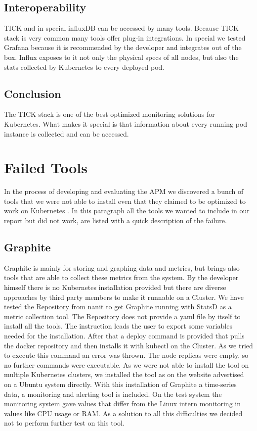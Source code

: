 \subsection{Interoperability}
TICK and in special influxDB can be accessed by many tools. Because TICK stack is very common many tools offer plug-in integrations. In special we tested Grafana because it is recommended by the developer and integrates out of the box. Influx exposes to it not only the physical specs of all nodes, but also the stats collected by Kubernetes to every deployed pod. 
\subsection{Conclusion}
The TICK stack is one of the best optimized monitoring solutions for Kubernetes. What makes it special is that information about every running pod instance is collected and can be accessed.



\section{Failed Tools}%
In the process of developing and evaluating the APM we discovered a bunch of tools that we were not able to install even that they claimed to be optimized to work on Kubernetes .
In this paragraph all the tools we wanted to include in our report but did not work, are listed with a quick description of the failure.
\subsection{Graphite}
Graphite is mainly for storing and graphing data and metrics, but brings also tools that are able to collect these metrics from the system. By the developer himself there is no Kubernetes installation provided but there are diverse approaches by third party members to make it runnable on a Cluster. We have tested the Repository from nanit \cite{graphite} to get Graphite running with StatsD \cite{statsd} as a metric collection tool. The Repository does not provide a yaml file by itself to install all the tools. The instruction leads the user to export some variables needed for the installation. After that a deploy command is provided that pulls the docker repository and then installs it with kubectl on the Cluster. As we tried to execute this command an error was thrown. The node replicas were empty, so no further commands were executable. As we were not able to install the tool on multiple Kubernetes clusters, we installed the tool as on the website advertised on a Ubuntu system directly. With this installation of Graphite a time-series data, a monitoring and alerting tool is included. On the test system the monitoring system gave values that differ from the Linux intern monitoring in values like CPU usage or RAM. As a solution to all this difficulties we decided not to perform further test on this tool.

